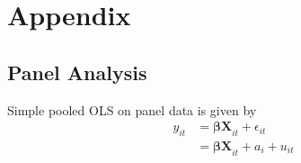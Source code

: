 \section{Appendix}
\label{s:appendix}

\subsection{Panel Analysis}
\label{s:appendix_panel}
Simple pooled OLS on panel data is given by
\begin{align}
    y_{it}
    &= \bm{\beta X}_{it} + \epsilon_{it} \\ 
    &= \bm{\beta X}_{it} + a_i + u_{it} \nonumber
\end{align}

\begin{figure}
    \centering
\end{figure}
